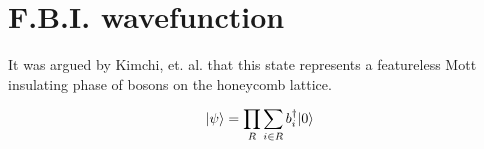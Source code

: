 
\section{F.B.I. wavefunction}

It was argued by Kimchi, et. al. \cite{Kimchi2012-lr} that this state represents a featureless Mott insulating phase of bosons on the honeycomb lattice.

\begin{equation}
\vert \psi \rangle = \prod\limits_{R} \sum\limits_{i \in R} b^{\dagger}_{i} \vert 0 \rangle
\label{eq:def}
\end{equation}

